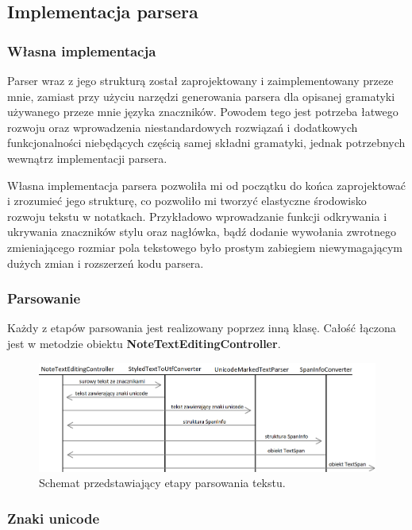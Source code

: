\subsection{Implementacja parsera}

\subsubsection{Własna implementacja}

Parser wraz z jego strukturą został zaprojektowany i zaimplementowany przeze mnie, zamiast przy użyciu narzędzi generowania parsera dla opisanej gramatyki używanego przeze mnie języka znaczników. Powodem tego jest potrzeba łatwego rozwoju oraz wprowadzenia niestandardowych rozwiązań i dodatkowych funkcjonalności niebędących częścią samej składni gramatyki, jednak potrzebnych wewnątrz implementacji parsera.

Własna implementacja parsera pozwoliła mi od początku do końca zaprojektować i zrozumieć jego strukturę, co pozwoliło mi tworzyć elastyczne środowisko rozwoju tekstu w notatkach. Przykładowo wprowadzanie funkcji odkrywania i ukrywania znaczników stylu oraz nagłówka, bądź dodanie wywołania zwrotnego zmieniającego rozmiar pola tekstowego było prostym zabiegiem niewymagającym dużych zmian i rozszerzeń kodu parsera.

\subsubsection{Parsowanie}

Każdy z etapów parsowania jest realizowany poprzez inną klasę. Całość łączona jest w metodzie obiektu \textbf{NoteTextEditingController}.
\newline
\begin{figure}[ht]
    \centering
    \includegraphics[width=\linewidth]{images/etapy_parsowania.png}
    \caption{Schemat przedstawiający etapy parsowania tekstu.}
    \label{fig:etapyParsowania}
\end{figure}

\subsubsection{Znaki unicode}


